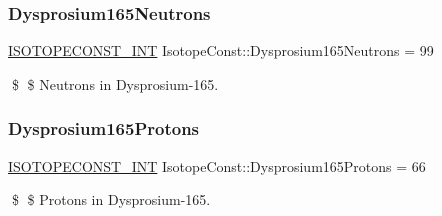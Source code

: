 \subsubsection{\texorpdfstring{Dysprosium165\+Neutrons}{Dysprosium165Neutrons}}
{\footnotesize\ttfamily \mbox{\hyperlink{group___isotope_const-_macros_ga5f18360b3e99483a35c32d789e62621c}{I\+S\+O\+T\+O\+P\+E\+C\+O\+N\+S\+T\+\_\+\+I\+NT}} Isotope\+Const\+::\+Dysprosium165\+Neutrons = 99}

\$ \$ Neutrons in Dysprosium-\/165. \mbox{\label{group___isotope_const-_dysprosium-_dy165_ga84667e832dd4b6df62d912de7c4767c0}} 
\subsubsection{\texorpdfstring{Dysprosium165\+Protons}{Dysprosium165Protons}}
{\footnotesize\ttfamily \mbox{\hyperlink{group___isotope_const-_macros_ga5f18360b3e99483a35c32d789e62621c}{I\+S\+O\+T\+O\+P\+E\+C\+O\+N\+S\+T\+\_\+\+I\+NT}} Isotope\+Const\+::\+Dysprosium165\+Protons = 66}

\$ \$ Protons in Dysprosium-\/165. 